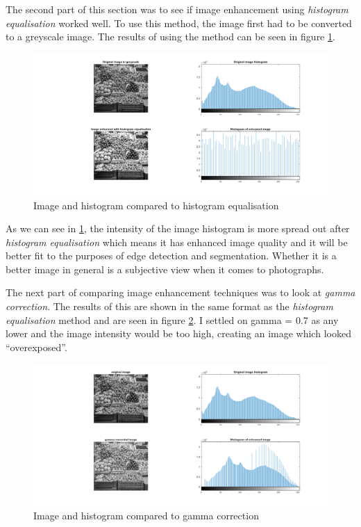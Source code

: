 \documentclass[11pt, letterpaper]{article}
\begin{document}
The second part of this section was to see if image enhancement using \textit{histogram equalisation} worked well. To use this method, the image first had to be converted to a greyscale image. The results of using the method can be seen in figure \ref{fig:ImagesHistogramsEnhancedHistEq}.

\begin{figure}[ht]
  \centering
  \includegraphics[width=1\linewidth]{Lab 1/ImagesHistogramsEnhancedHistEq.png}
  \caption{Image and histogram compared to histogram equalisation}
  \label{fig:ImagesHistogramsEnhancedHistEq}
\end{figure}

As we can see in \ref{fig:ImagesHistogramsEnhancedHistEq}, the intensity of the image histogram is more spread out after \textit{histogram equalisation} which means it has enhanced image quality and it will be better fit to the purposes of edge detection and segmentation. Whether it is a better image in general is a subjective view when it comes to photographs.

The next part of comparing image enhancement techniques was to look at \textit{gamma correction}. The results of this are shown in the same format as the \textit{histogram equalisation} method and are seen in figure \ref{fig:ImagesHistogramsEnhancedGammaCorrection}. I settled on gamma = 0.7 as any lower and the image intensity would be too high, creating an image which looked ``overexposed''.

\begin{figure}[ht]
  \centering
  \includegraphics[width=1\linewidth]{Lab 1/ImagesHistogramsEnhancedGammaCorrection.png}
  \caption{Image and histogram compared to gamma correction}
  \label{fig:ImagesHistogramsEnhancedGammaCorrection}
\end{figure}
\end{document}
